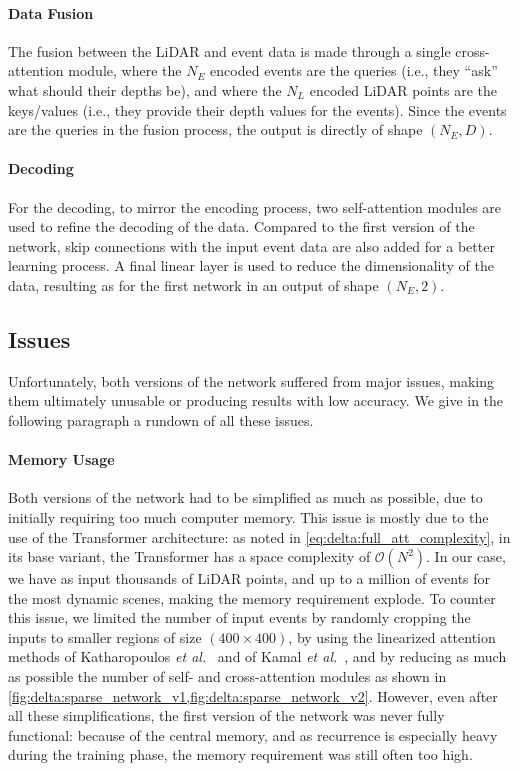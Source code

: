 \paragraph{Data Fusion}
The fusion between the LiDAR and event data is made through a single cross-attention module, where the \(N_E\) encoded events are the queries (i.e., they ``ask'' what should their depths be), and where the \(N_L\) encoded LiDAR points are the keys/values (i.e., they provide their depth values for the events). Since the events are the queries in the fusion process, the output is directly of shape \((N_E, D)\).

\paragraph{Decoding}
For the decoding, to mirror the encoding process, two self-attention modules are used to refine the decoding of the data. Compared to the first version of the network, skip connections with the input event data are also added for a better learning process. A final linear layer is used to reduce the dimensionality of the data, resulting as for the first network in an output of shape \((N_E, 2)\).

\subsection{Issues}
Unfortunately, both versions of the network suffered from major issues, making them ultimately unusable or producing results with low accuracy. We give in the following paragraph a rundown of all these issues.

\paragraph{Memory Usage}
Both versions of the network had to be simplified as much as possible, due to initially requiring too much computer memory. This issue is mostly due to the use of the Transformer architecture: as noted in \cref{eq:delta:full_att_complexity}, in its base variant, the Transformer has a space complexity of \(\mathcal{O}(N^2)\). In our case, we have as input thousands of LiDAR points, and up to a million of events for the most dynamic scenes, making the memory requirement explode. To counter this issue, we limited the number of input events by randomly cropping the inputs to smaller regions of size \((400\times{}400)\), by using the linearized attention methods of Katharopoulos \textit{et al.}~\cite{Katharopoulos2020TransformersAR} and of Kamal \textit{et al.}~\cite{Kamal2023AssociativeMA}, and by reducing as much as possible the number of self- and cross-attention modules as shown in \cref{fig:delta:sparse_network_v1,fig:delta:sparse_network_v2}. However, even after all these simplifications, the first version of the network was never fully functional: because of the central memory, and as recurrence is especially heavy during the training phase, the memory requirement was still often too high.

